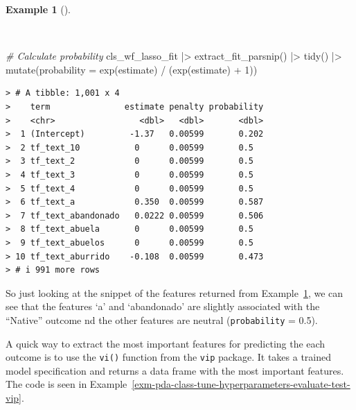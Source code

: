 \documentclass[
  letterpaper,
  DIV=11,
  numbers=noendperiod]{scrreprt}
\newenvironment{Shaded}{\begin{snugshade}}{\end{snugshade}}
\newcommand{\AttributeTok}[1]{\textcolor[rgb]{0.00,0.00,0.00}{#1}}
\newcommand{\CommentTok}[1]{\textcolor[rgb]{0.00,0.00,0.00}{\textit{#1}}}
\newcommand{\DecValTok}[1]{\textcolor[rgb]{0.00,0.00,0.00}{#1}}
\newcommand{\FunctionTok}[1]{\textcolor[rgb]{0.00,0.00,0.00}{#1}}
\newcommand{\NormalTok}[1]{\textcolor[rgb]{0.00,0.00,0.00}{#1}}
\newcommand{\SpecialCharTok}[1]{\textcolor[rgb]{0.00,0.00,0.00}{#1}}
\theoremstyle{definition}
\newtheorem{example}{Example}[chapter]
\theoremstyle{remark}
\begin{document}
\begin{example}[]\protect\hypertarget{exm-pda-class-tune-hyperparameters-evaluate-test-estimates-probability}{}\label{exm-pda-class-tune-hyperparameters-evaluate-test-estimates-probability}

~

\begin{Shaded}
\begin{Highlighting}[]
\CommentTok{\# Calculate probability}
\NormalTok{cls\_wf\_lasso\_fit }\SpecialCharTok{|\textgreater{}}
  \FunctionTok{extract\_fit\_parsnip}\NormalTok{() }\SpecialCharTok{|\textgreater{}}
  \FunctionTok{tidy}\NormalTok{() }\SpecialCharTok{|\textgreater{}}
  \FunctionTok{mutate}\NormalTok{(}\AttributeTok{probability =} \FunctionTok{exp}\NormalTok{(estimate) }\SpecialCharTok{/}\NormalTok{ (}\FunctionTok{exp}\NormalTok{(estimate) }\SpecialCharTok{+} \DecValTok{1}\NormalTok{))}
\end{Highlighting}
\end{Shaded}

\begin{verbatim}
> # A tibble: 1,001 x 4
>    term               estimate penalty probability
>    <chr>                 <dbl>   <dbl>       <dbl>
>  1 (Intercept)         -1.37   0.00599       0.202
>  2 tf_text_10           0      0.00599       0.5  
>  3 tf_text_2            0      0.00599       0.5  
>  4 tf_text_3            0      0.00599       0.5  
>  5 tf_text_4            0      0.00599       0.5  
>  6 tf_text_a            0.350  0.00599       0.587
>  7 tf_text_abandonado   0.0222 0.00599       0.506
>  8 tf_text_abuela       0      0.00599       0.5  
>  9 tf_text_abuelos      0      0.00599       0.5  
> 10 tf_text_aburrido    -0.108  0.00599       0.473
> # i 991 more rows
\end{verbatim}

\end{example}

So just looking at the snippet of the features returned from
Example~\ref{exm-pda-class-tune-hyperparameters-evaluate-test-estimates-probability},
we can see that the features `a' and `abandonado' are slightly
associated with the ``Native'' outcome nd the other features are neutral
(\texttt{probability} = 0.5).

A quick way to extract the most important features for predicting the
each outcome is to use the \texttt{vi()} function from the \texttt{vip}
package. It takes a trained model specification and returns a data frame
with the most important features. The code is seen in
Example~\ref{exm-pda-class-tune-hyperparameters-evaluate-test-vip}.
\end{document}
